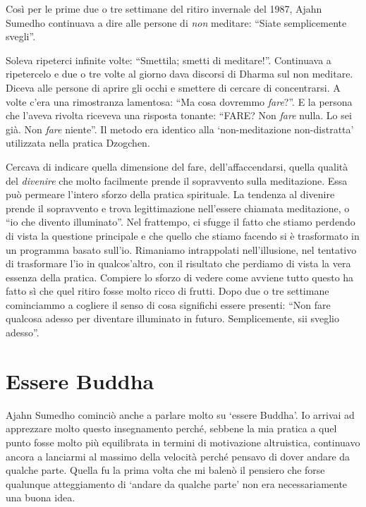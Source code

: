 Così per le prime due o tre settimane del ritiro invernale del 1987, Ajahn Sumedho continuava a dire alle persone di \textit{non} meditare: ``Siate semplicemente svegli''.

Soleva ripeterci infinite volte: ``Smettila; smetti di meditare!''. Continuava a ripetercelo e due o tre volte al giorno dava discorsi di Dharma sul non meditare. Diceva alle persone di aprire gli occhi e smettere di cercare di concentrarsi. A volte c'era una rimostranza lamentosa: ``Ma cosa dovremmo \textit{fare}?''. E la persona che l'aveva rivolta riceveva una risposta tonante: ``FARE? Non \textit{fare} nulla. Lo sei già. Non \textit{fare} niente''. Il metodo era identico alla `non-meditazione non-distratta' utilizzata nella pratica Dzogchen.

Cercava di indicare quella dimensione del fare, dell'affaccendarsi, quella qualità del \textit{divenire} che molto facilmente prende il sopravvento sulla meditazione. Essa può permeare l'intero sforzo della pratica spirituale. La tendenza al divenire prende il sopravvento e trova legittimazione nell'essere chiamata meditazione, o ``io che divento illuminato''. Nel frattempo, ci sfugge il fatto che stiamo perdendo di vista la questione principale e che quello che stiamo facendo si è trasformato in un programma basato sull'io. Rimaniamo intrappolati nell'illusione, nel tentativo di trasformare l'io in qualcos'altro, con il risultato che perdiamo di vista la vera essenza della pratica. Compiere lo sforzo di vedere come avviene tutto questo ha fatto sì che quel ritiro fosse molto ricco di frutti. Dopo due o tre settimane cominciammo a cogliere il senso di cosa significhi essere presenti: ``Non fare qualcosa adesso per diventare illuminato in futuro. Semplicemente, sii sveglio adesso''.

\section*{Essere Buddha}

Ajahn Sumedho cominciò anche a parlare molto su `essere Buddha'. Io arrivai ad apprezzare molto questo insegnamento perché, sebbene la mia pratica a quel punto fosse molto più equilibrata in termini di motivazione altruistica, continuavo ancora a lanciarmi al massimo della velocità perché pensavo di dover andare da qualche parte. Quella fu la prima volta che mi balenò il pensiero che forse qualunque atteggiamento di `andare da qualche parte' non era necessariamente una buona idea. 

